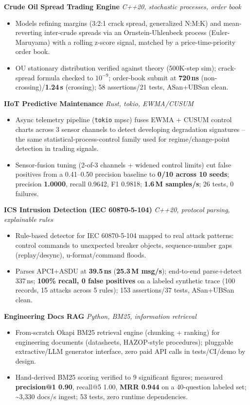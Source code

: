 \documentclass[10pt]{article}
\newcommand{\projectentry}[2]{%
  \noindent\textbf{#1} \hfill \textit{#2}\\[-0.3em]
}
\begin{document}
\projectentry{Crude Oil Spread Trading Engine}{C++20, stochastic processes, order book}
\begin{itemize}
  \item Models refining margins (3:2:1 crack spread, generalized N:M:K) and mean-reverting inter-crude spreads via an Ornstein-Uhlenbeck process (Euler-Maruyama) with a rolling z-score signal, matched by a price-time-priority order book.
  \item OU stationary distribution verified against theory (500K-step sim); crack-spread formula checked to $10^{-9}$; order-book submit at \textbf{720\,ns} (non-crossing)/\textbf{1.24\,\textmu s} (crossing); 58 assertions/21 tests, ASan+UBSan clean.
\end{itemize}

\projectentry{IIoT Predictive Maintenance}{Rust, tokio, EWMA/CUSUM}
\begin{itemize}
  \item Async telemetry pipeline (\texttt{tokio} mpsc) fuses EWMA + CUSUM control charts across 3 sensor channels to detect developing degradation signatures -- the same statistical-process-control family used for regime/change-point detection in trading signals.
  \item Sensor-fusion tuning (2-of-3 channels + widened control limits) cut false positives from a 0.41--0.50 precision baseline to \textbf{0/10 across 10 seeds}; precision \textbf{1.0000}, recall 0.9642, F1 0.9818; \textbf{1.6\,M samples/s}; 26 tests, 0 failures.
\end{itemize}

\projectentry{ICS Intrusion Detection (IEC 60870-5-104)}{C++20, protocol parsing, explainable rules}
\begin{itemize}
  \item Rule-based detector for IEC 60870-5-104 mapped to real attack patterns: control commands to unexpected breaker objects, sequence-number gaps (replay/desync), u-format/command floods.
  \item Parses APCI+ASDU at \textbf{39.5\,ns} (\textbf{25.3\,M msg/s}); end-to-end parse+detect 337\,ns; \textbf{100\% recall, 0 false positives} on a labeled synthetic trace (100 records, 15 attacks across 5 rules); 153 assertions/37 tests, ASan+UBSan clean.
\end{itemize}

\projectentry{Engineering Docs RAG}{Python, BM25, information retrieval}
\begin{itemize}
  \item From-scratch Okapi BM25 retrieval engine (chunking + ranking) for engineering documents (datasheets, HAZOP-style procedures); pluggable extractive/LLM generator interface, zero paid API calls in tests/CI/demo by design.
  \item Hand-derived BM25 scoring verified to 9 significant figures; measured \textbf{precision@1 0.90}, recall@5 1.00, \textbf{MRR 0.944} on a 40-question labeled set; \textasciitilde3{,}330 docs/s ingest; 53 tests, zero runtime dependencies.
\end{itemize}
\end{document}
